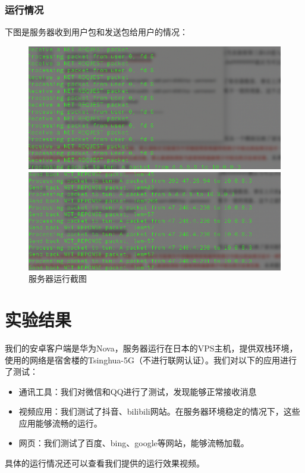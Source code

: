 \documentclass[paper=a4, fontsize=11pt, UTF8]{article} %
\begin{document}
\subsubsection{运行情况}
下图是服务器收到用户包和发送包给用户的情况：
\begin{figure}[H]
	\centering %
	\begin{minipage}[b]{0.45\textwidth} %
		\centering %
		\includegraphics[scale=0.25]{./photos/1.png} %
	\end{minipage}
	\begin{minipage}[b]{0.45\textwidth} %
		\centering %
		\includegraphics[scale=0.25]{./photos/2.png}%
    \end{minipage}
    \caption{服务器运行截图}
    \label{server}
\end{figure}

\section{实验结果}
我们的安卓客户端是华为Nova，服务器运行在日本的VPS主机，提供双栈环境，使用的网络是宿舍楼的Tsinghua-5G（不进行联网认证）。我们对以下的应用进行了测试：
\begin{itemize}
    \item 通讯工具：我们对微信和QQ进行了测试，发现能够正常接收消息
    \item 视频应用：我们测试了抖音、bilibili网站。在服务器环境稳定的情况下，这些应用能够流畅的运行。
    \item 网页：我们测试了百度、bing、google等网站，能够流畅加载。
\end{itemize}
具体的运行情况还可以查看我们提供的运行效果视频。
\end{document}
